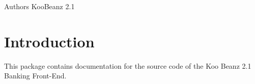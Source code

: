 \begin{DoxyAuthor}{Authors}
KooBeanz 2.1 
\end{DoxyAuthor}
\hypertarget{index_intro}{}\section{Introduction}\label{index_intro}
 This package contains documentation for the source code of the Koo Beanz 2.1 Banking Front-\/End. 